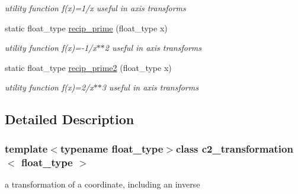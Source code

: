 \begin{DoxyCompactItemize}
\begin{DoxyCompactList}\small\item\em utility function f(x)=1/x useful in axis transforms \end{DoxyCompactList}\item 
\hypertarget{classc2__transformation_aac46f68fd9037c3f65b9578e0d7000fe}{static float\-\_\-type \hyperlink{classc2__transformation_aac46f68fd9037c3f65b9578e0d7000fe}{recip\-\_\-prime} (float\-\_\-type x)}\label{classc2__transformation_aac46f68fd9037c3f65b9578e0d7000fe}

\begin{DoxyCompactList}\small\item\em utility function f(x)=-\/1/x$\ast$$\ast$2 useful in axis transforms \end{DoxyCompactList}\item 
\hypertarget{classc2__transformation_a58e93b52b477a022e7b74c5e1056d3d7}{static float\-\_\-type \hyperlink{classc2__transformation_a58e93b52b477a022e7b74c5e1056d3d7}{recip\-\_\-prime2} (float\-\_\-type x)}\label{classc2__transformation_a58e93b52b477a022e7b74c5e1056d3d7}

\begin{DoxyCompactList}\small\item\em utility function f(x)=2/x$\ast$$\ast$3 useful in axis transforms \end{DoxyCompactList}\end{DoxyCompactItemize}


\subsection{Detailed Description}
\subsubsection*{template$<$typename float\-\_\-type$>$class c2\-\_\-transformation$<$ float\-\_\-type $>$}

a transformation of a coordinate, including an inverse 

